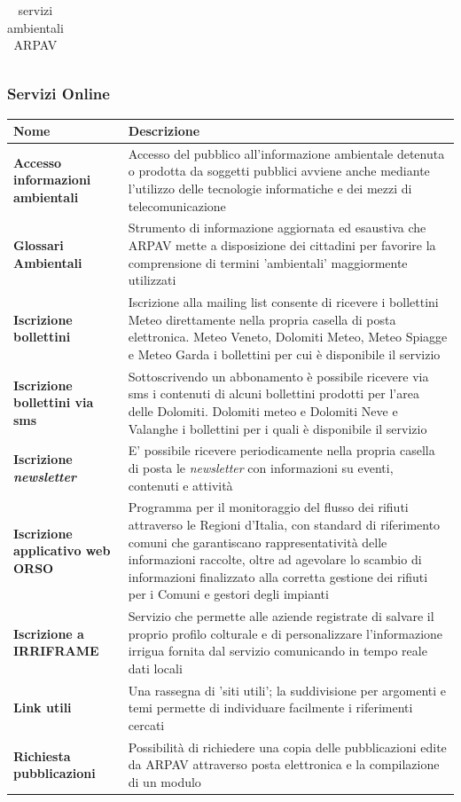 \begin{longtable}{ p{} | p{} | p{}}
\caption{servizi ambientali ARPAV}
\end{longtable}

\subsubsection{Servizi Online}

\begin{longtable}{p{}|p{}}
\textbf{Nome} & \textbf{Descrizione} \\
\endhead

\midrule
\textbf{{\color{Plum} Accesso informazioni ambientali}} & Accesso del pubblico all'informazione ambientale detenuta o prodotta da soggetti pubblici avviene anche mediante l'utilizzo delle tecnologie informatiche e dei mezzi di telecomunicazione \\
\midrule
\textbf{{\color{Plum} Glossari Ambientali}} & Strumento di informazione aggiornata ed esaustiva che ARPAV mette a disposizione dei cittadini per favorire la comprensione di termini 'ambientali' maggiormente utilizzati \\
\midrule
\textbf{{\color{Plum} Iscrizione bollettini}} & Iscrizione alla mailing list consente di ricevere i bollettini Meteo direttamente nella propria casella di posta elettronica. Meteo Veneto, Dolomiti Meteo, Meteo Spiagge e Meteo Garda i bollettini per cui è disponibile il servizio \\
\midrule
\textbf{{\color{Plum} Iscrizione bollettini via sms}} & Sottoscrivendo un abbonamento è possibile ricevere via sms i contenuti di alcuni bollettini prodotti per l'area delle Dolomiti. Dolomiti meteo e Dolomiti Neve e Valanghe i bollettini per i quali è disponibile il servizio \\
\midrule
\textbf{{\color{Plum} Iscrizione \textit{newsletter}}} &  E' possibile ricevere periodicamente nella propria casella di posta le \textit{newsletter} con informazioni su eventi, contenuti e attività \\
\midrule
\textbf{{\color{Plum} Iscrizione applicativo web ORSO }} &  Programma per il monitoraggio del flusso dei rifiuti attraverso le Regioni d'Italia, con standard di riferimento comuni che garantiscano rappresentatività delle informazioni raccolte, oltre ad agevolare lo scambio di informazioni finalizzato alla corretta gestione dei rifiuti per i Comuni e gestori degli impianti \\
\midrule
\textbf{{\color{Plum} Iscrizione a IRRIFRAME}} & Servizio che permette alle aziende registrate di salvare il proprio profilo colturale e di personalizzare l'informazione irrigua fornita dal servizio comunicando in tempo reale dati locali \\
\midrule
\textbf{{\color{Plum} Link utili}} & Una rassegna di 'siti utili'; la suddivisione per argomenti e temi permette di individuare facilmente i riferimenti cercati \\
\midrule
\textbf{{\color{Plum} Richiesta pubblicazioni}} & Possibilità di richiedere una copia delle pubblicazioni edite da ARPAV attraverso posta elettronica e la compilazione di un modulo \\
\bottomrule


\end{longtable}
